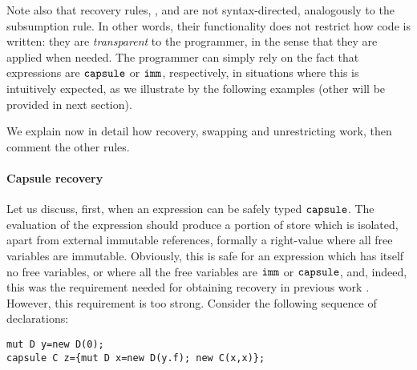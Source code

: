 {Note also that recovery rules, , and   are not syntax-directed, analogously to the subsumption rule. 
In other words, their functionality does not  restrict how code is written: they are \emph{transparent} to the programmer, in the sense that they are applied when needed.  The programmer can simply rely on the fact that expressions are $\texttt{capsule}$ or $\texttt{imm}$, respectively, in situations where this is intuitively expected, as we illustrate by the following examples (other will be provided in next section).}

{We explain now in detail how recovery, swapping and unrestricting work, then comment the other rules.}

\paragraph{Capsule {recovery}} Let us discuss, first, when an expression can be safely typed $\texttt{capsule}$. {The evaluation of the expression should produce a portion of store which is isolated, apart from external immutable references, formally a right-value where all free variables are immutable. Obviously, this is safe for an expression which has itself no free variables, or where all the free variables are {$\texttt{imm}$ or $\texttt{capsule}$}, and, indeed, this was the requirement needed for obtaining {recovery} in previous work \cite{GordonEtAl12}.} However, this requirement is too strong. 
Consider the following sequence of declarations:\label{capsule-example-2}

\begin{lstlisting}
mut D y=new D(0); 
capsule C z={mut D x=new D(y.f); new C(x,x)};  
\end{lstlisting}


